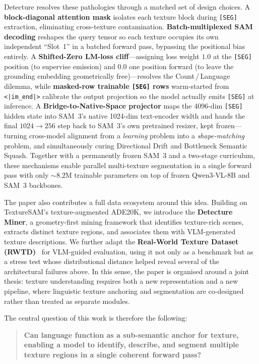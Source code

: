 \documentclass{article}
\begin{document}
Detecture resolves these pathologies through a matched set of design choices. A \textbf{block-diagonal attention mask} isolates each texture block during \texttt{[SEG]} extraction, eliminating cross-texture contamination. \textbf{Batch-multiplexed SAM decoding} reshapes the query tensor so each texture occupies its own independent ``Slot~1'' in a batched forward pass, bypassing the positional bias entirely. A \textbf{Shifted-Zero LM-loss cliff}---assigning loss weight $1.0$ at the \texttt{[SEG]} position (to supervise emission) and $0.0$ one position forward (to leave the grounding embedding geometrically free)---resolves the Count\,/\,Language dilemma, while \textbf{masked-row trainable \texttt{[SEG]} rows} warm-started from \texttt{<|im\_end|>} calibrate the output projection so the model actually emits \texttt{[SEG]} at inference. A \textbf{Bridge-to-Native-Space projector} maps the 4096-dim \texttt{[SEG]} hidden state into SAM~3's native 1024-dim text-encoder width and hands the final $1024 \to 256$ step back to SAM~3's own pretrained resizer, kept frozen---turning cross-model alignment from a \emph{learning} problem into a \emph{shape-matching} problem, and simultaneously curing Directional Drift and Bottleneck Semantic Squash. Together with a permanently frozen SAM~3 and a two-stage curriculum, these mechanisms enable parallel multi-texture segmentation in a single forward pass with only ${\sim}8.2$M trainable parameters on top of frozen Qwen3-VL-8B and SAM~3 backbones.

The paper also contributes a full data ecosystem around this idea. Building on TextureSAM's texture-augmented ADE20K, we introduce the \textbf{Detecture Miner}, a geometry-first mining framework that identifies texture-rich scenes, extracts distinct texture regions, and associates them with VLM-generated texture descriptions. We further adapt the \textbf{Real-World Texture Dataset (RWTD)}~\cite{texturesam} for VLM-guided evaluation, using it not only as a benchmark but as a stress test whose distributional distance helped reveal several of the architectural failures above. In this sense, the paper is organised around a joint thesis: texture understanding requires both a new representation and a new pipeline, where linguistic texture anchoring and segmentation are co-designed rather than treated as separate modules.

The central question of this work is therefore the following:

\begin{quote}
\textbf{Can language function as a sub-semantic anchor for texture, enabling a model to identify, describe, and segment multiple texture regions in a single coherent forward pass?}
\end{quote}
\end{document}

